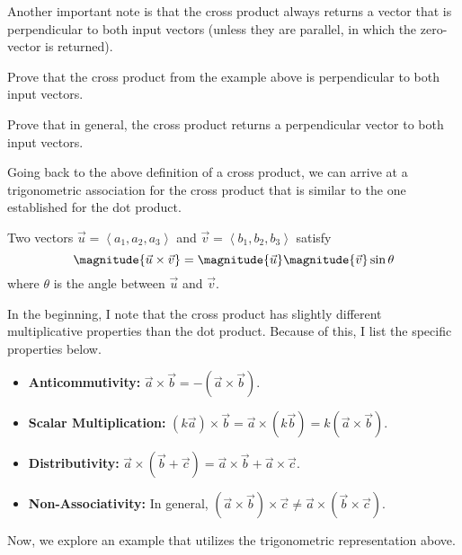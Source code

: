 \documentclass[11pt]{scrartcl}
\begin{document}
\begin{remark}
    Another important note is that the cross product always returns a vector that is perpendicular to both input vectors (unless they are parallel, in which the zero-vector is returned).
\end{remark}

\begin{exercise}
    Prove that the cross product from the example above is perpendicular to both input vectors.
\end{exercise}

\begin{exercise}
    Prove that in general, the cross product returns a perpendicular vector to both input vectors.
\end{exercise}

Going back to the above definition of a cross product, we can arrive at a trigonometric association for the cross product that is similar to the one established for the dot product.

\begin{proposition}
    Two vectors $\vec{u} = \left<a_{1}, a_{2}, a_{3}\right>$ and $\vec{v} = \left<b_{1}, b_{2}, b_{3}\right>$ satisfy
    \[\magnitude{\vec{u} \times \vec{v}} = \magnitude{\vec{u}} \magnitude{\vec{v}} \sin\theta\]
    where $\theta$ is the angle between $\vec{u}$ and $\vec{v}$.
\end{proposition}

In the beginning, I note that the cross product has slightly different multiplicative properties than the dot product. Because of this, I list the specific properties below.

\begin{itemize}
    \item \textbf{Anticommutivity:} $\vec{a} \times \vec{b} = -(\vec{a} \times \vec{b})$.
    \item \textbf{Scalar Multiplication:} $(k\vec{a}) \times \vec{b} = \vec{a} \times (k\vec{b}) = k(\vec{a} \times \vec{b})$.
    \item \textbf{Distributivity:} $\vec{a} \times (\vec{b} + \vec{c}) = \vec{a} \times \vec{b} + \vec{a} \times \vec{c}$.
    \item \textbf{Non-Associativity:} In general, $(\vec{a} \times \vec{b}) \times \vec{c} \neq \vec{a} \times (\vec{b} \times \vec{c})$.
\end{itemize}

Now, we explore an example that utilizes the trigonometric representation above.
\end{document}
